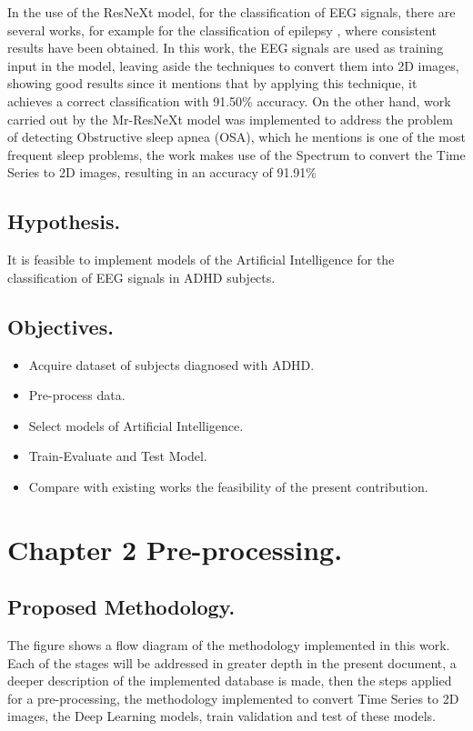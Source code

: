 \documentclass[letterpaper,12pt,openright,oneside]{article}
\begin{document}
In the use of the ResNeXt model, for the classification of EEG signals, there are several works, for example for the classification of epilepsy \cite{Wang2019.12.27.889238}, where consistent results have been obtained. In this work, the EEG signals are used as training input in the model, leaving aside the techniques to convert them into 2D images, showing good results since it mentions that by applying this technique, it achieves a correct classification with 91.50\% accuracy. On the other hand, work carried out by \cite{Chen} the Mr-ResNeXt model was implemented to address the problem of detecting Obstructive sleep apnea (OSA), which he mentions is one of the most frequent sleep problems, the work makes use of the Spectrum to convert the Time Series to 2D images, resulting in an accuracy of 91.91\%


\subsection{Hypothesis.}
It is feasible to implement models of the Artificial Intelligence  for the classification of EEG signals in ADHD subjects.

\subsection{Objectives.}

\begin{itemize}
\item Acquire dataset of subjects diagnosed with ADHD.
\item Pre-process data.
\item Select models of Artificial Intelligence.
\item Train-Evaluate and Test Model.
\item Compare with existing works the feasibility of the present contribution.  
\end{itemize}


\pagebreak



\section{Chapter 2 Pre-processing.}

\subsection{Proposed Methodology.}
The figure shows a flow diagram of the methodology implemented in this work. Each of the stages will be addressed in greater depth in the present document, a deeper description of the implemented database is made, then the steps applied for a pre-processing, the methodology implemented to convert Time Series to 2D images, the Deep Learning models, train validation and test of these models.\\
\end{document}

